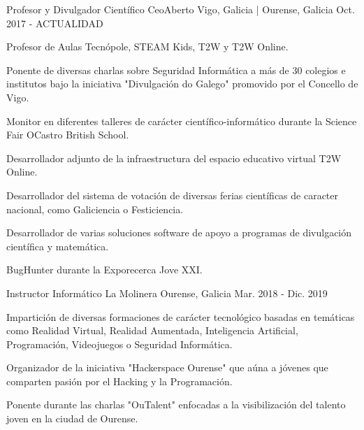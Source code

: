 \documentclass[11pt, a4paper]{style}
\begin{document}
\begin{cventries}
    \vspace{0.1cm}
  \cventry
    {Profesor y Divulgador Científico} %
    {CeoAberto} %
    {Vigo, Galicia | Ourense, Galicia} %
    {Oct. 2017 - ACTUALIDAD} %
    {
      \begin{cvitems} %
        \item {Profesor de Aulas Tecnópole, STEAM Kids, T2W y T2W Online.}
        \item {Ponente de diversas charlas sobre Seguridad Informática a más de 30 colegios e institutos bajo la iniciativa "Divulgación do Galego" promovido por el Concello de Vigo.}
        \item {Monitor en diferentes talleres de carácter científico-informático durante la Science Fair OCastro British School.}
        \item {Desarrollador adjunto de la infraestructura del espacio educativo virtual T2W Online.}
        \item {Desarrollador del sistema de votación de diversas ferias científicas de caracter nacional, como Galiciencia o Festiciencia.}
        \item {Desarrollador de varias soluciones software de apoyo a programas de divulgación científica y matemática.}
        \item {BugHunter durante la Exporecerca Jove XXI.}
      \end{cvitems}
    }
    \vspace{0.1cm}
  \cventry
    {Instructor Informático} %
    {La Molinera} %
    {Ourense, Galicia} %
    {Mar. 2018 - Dic. 2019} %
    {
      \begin{cvitems} %
        \item {Impartición de diversas formaciones de carácter tecnológico basadas en temáticas como Realidad Virtual, Realidad Aumentada, Inteligencia Artificial, Programación, Videojuegos o Seguridad Informática.}
        \item {Organizador de la iniciativa "Hackerspace Ourense" que aúna a jóvenes que comparten pasión por el Hacking y la Programación.}
        \item {Ponente durante las charlas "OuTalent" enfocadas a la visibilización del talento joven en la ciudad de Ourense.}

\end{cvitems}}
\end{cventries}
\end{document}

